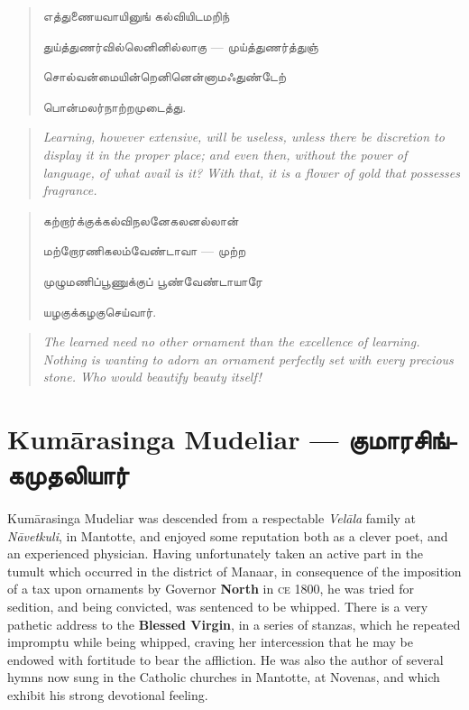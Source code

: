 \documentclass{article}
\newcommand{\TamilText}[1]{\texttamil{#1}}
\newcommand{\TamilBold}[1]{\texttamil{\textbf{#1}}}
\newcommand{\tam}[1]{\TamilText{#1}}
\newcommand{\tambold}[1]{\TamilBold{#1}}
\begin{document}
\begin{quotation}\small
\tam{எத்துணையவாயினுங்‌ கல்வியிடமறிந்}

\tam{துய்த்துணர்வில்லெனினில்லாகு} --- \tam{முய்த்துணர்த்துஞ்}

\tam{சொல்வன்மையின்றெனினென்னாமஃதுண்டேற்‌}

\tam{பொன்மலர்நாற்றமுடைத்து}.
\end{quotation}
\begin{quotation}\small
\emph{Learning, however extensive, will be useless, unless there be discretion to display it in the proper place; and even then, without the power of language, of what avail is it? With that, it is a flower of gold that possesses fragrance.}
\end{quotation}
\begin{quotation}\small
\tam{கற்றார்க்குக்கல்விநலனேகலனல்லான்‌}

\tam{மற்றோரணிகலம்வேண்டாவா} --- \tam{முற்ற}

\tam{முழுமணிப்பூணுக்குப்‌ பூண்வேண்டாயாரே}

\tam{யழகுக்கழகுசெய்வார்‌}.
\end{quotation}
\begin{quotation}\small
\emph{The learned need no other ornament than the excellence of learning. Nothing is wanting to adorn an ornament perfectly set with every precious stone. Who would beautify beauty itself!}
\end{quotation}

\section{Kum\={a}rasinga Mudeliar --- \tambold{குமாரசிங்கமுதலியார்}}
\paragraph{}
Kum\={a}rasinga Mudeliar was descended from a respectable \emph{Vel\={a}la} family at \emph{N\={a}vetkuli}, in Mantotte, and enjoyed some reputation both as a clever poet, and an experienced physician. Having unfortunately taken an active part in the tumult which occurred in the district of Manaar, in consequence of the imposition of a tax upon ornaments by Governor \textbf{North} in \textsc{ce} 1800, he was tried for sedition, and being convicted, was sentenced to be whipped. There is a very pathetic address to the \textbf{Blessed Virgin}, in a series of stanzas, which he repeated impromptu while being whipped, craving her intercession that he may be endowed with fortitude to bear the affliction. He was also the author of several hymns now sung in the Catholic churches in Mantotte, at Novenas, and which exhibit his strong devotional feeling.
\end{document}
